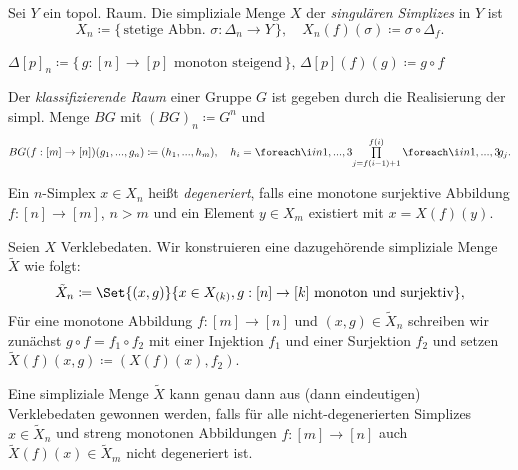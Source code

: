 \documentclass{cheat-sheet}
\newcommand{\nspace}[1]{\foreach \i in {1,...,#1}{ \! }} %
\begin{document}
\begin{defn}
  Sei $Y$ ein topol. Raum. Die simpliziale Menge $X$ der \emph{singulären Simplizes} in $Y$ ist
  \[
    X_n \coloneqq \{ \, \text{stetige Abbn. } \sigma : \Delta_n \to Y \, \}, \quad
    X_n(f)(\sigma) \coloneqq \sigma \circ \Delta_f.
  \]
\end{defn}

\begin{defn}
  $\Delta[p]_n \coloneqq \{ \, g : [n] \to [p] \text{ monoton steigend} \, \}$, $\Delta[p](f)(g) \coloneqq g \circ f$
\end{defn}

\begin{defn}
  Der \emph{klassifizierende Raum} einer Gruppe $G$ ist gegeben durch die Realisierung der simpl. Menge $BG$ mit $(BG)_n \coloneqq G^n$ und
  \begin{align*}
    BG(f : [m] \to [n])(g_1, ..., g_n) \coloneqq
    (h_1, ..., h_m), \quad h_i = \nspace{3} \prod_{j=f(i-1)+1}^{f(i)} \nspace{3} g_j.
  \end{align*}
\end{defn}

\begin{defn}
  Ein $n$-Simplex $x \in X_n$ heißt \emph{degeneriert}, falls eine monotone surjektive Abbildung $f : [n] \to [m]$, $n > m$ und ein Element $y \in X_m$ existiert mit $x = X(f)(y)$.
\end{defn}

\begin{defn}
  Seien $X$ Verklebedaten. Wir konstruieren eine dazugehörende simpliziale Menge $\tilde{X}$ wie folgt:
  \[ \tilde{X}_n \coloneqq \Set{ (x, g) }{ x \in X_{(k)}, g : [n] \to [k] \text{ monoton und surjektiv} }, \]
  Für eine monotone Abbildung $f : [m] \to [n]$ und $(x, g) \in \tilde{X}_n$ schreiben wir zunächst $g \circ f = f_1 \circ f_2$ mit einer Injektion $f_1$ und einer Surjektion $f_2$ und setzen
  $\tilde{X}(f)(x, g) \coloneqq (X(f)(x), f_2)$.
\end{defn}

\begin{prop}
  Eine simpliziale Menge $\tilde{X}$ kann genau dann aus (dann eindeutigen) Verklebedaten gewonnen werden, falls für alle nicht-degenerierten Simplizes $x \in \tilde{X}_n$ und streng monotonen Abbildungen $f : [m] \to [n]$ auch $\tilde{X}(f)(x) \in \tilde{X}_m$ nicht degeneriert ist.
\end{prop}
\end{document}

